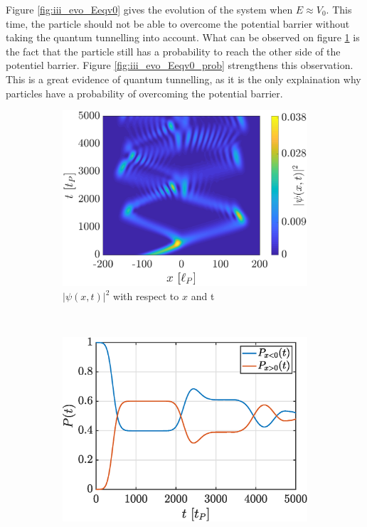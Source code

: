 \documentclass[a4paper,12pt,twoside]{article}
\begin{document}
    Figure \ref{fig:iii_evo_Eeqv0} gives the evolution of the system when $E \approx V_0$.
    This time, the particle should not be able to overcome the potential barrier without taking the quantum tunnelling into account.
    What can be observed on figure \ref{fig:iii_evo_Eeqv0_evo} is the fact that the particle still has a probability to reach the other side of the potentiel barrier.
    Figure \ref{fig:iii_evo_Eeqv0_prob} strengthens this observation.
    This is a great evidence of quantum tunnelling, as it is the only explaination why particles have a probability of overcoming the potential barrier.\\


    \begin{figure}[h]
      \centering
      \begin{subfigure}[t]{0.45\textwidth}
        \includegraphics[width=\textwidth]{graphs/iii_evo_Eeqv0_evo.eps}
        \caption{$|\psi(x, t)|^2$ with respect to $x$ and t}
        \label{fig:iii_evo_Eeqv0_evo}
      \end{subfigure}
      ~
      \begin{subfigure}[t]{0.45\textwidth}
        \includegraphics[width=\textwidth]{graphs/iii_evo_Eeqv0_prob.eps}

\end{subfigure}
\end{figure}
\end{document}
